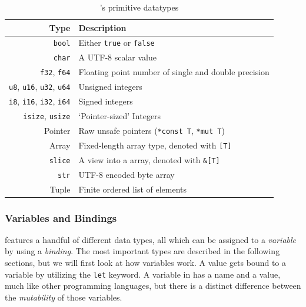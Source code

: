 \begin{table}[H]
  \centering
  \begin{tabular}{r|l}
    \textbf{Type} & \textbf{Description} \\
    \hline
    \texttt{bool}  & Either \texttt{true} or \texttt{false} \\
    \texttt{char}  & A UTF-8 scalar value \\
    \texttt{f32}, \texttt{f64} & Floating point number of single and double precision \\
    \texttt{u8}, \texttt{u16}, \texttt{u32}, \texttt{u64} & Unsigned integers \\
    \texttt{i8}, \texttt{i16}, \texttt{i32}, \texttt{i64} & Signed integers \\
    \texttt{isize}, \texttt{usize}                        & `Pointer-sized' Integers \\
    Pointer        & Raw unsafe pointers (\texttt{*const T}, \texttt{*mut T}) \\
    Array          & Fixed-length array type, denoted with \texttt{[T]} \\
    \texttt{slice} & A view into a array, denoted with \texttt{\&[T]} \\
    \texttt{str}   & UTF-8 encoded byte array \\
    Tuple          & Finite ordered list of elements \\
    \hline
  \end{tabular}

  \caption{\rust's primitive datatypes}
  \label{tab:rust:datatypes}
\end{table}




\subsubsection{Variables and Bindings}

\rust features a handful of different data types, all which can be assigned to a \emph{variable} by using a \emph{binding}.
The most important types are described in the following sections, but we will first look at how variables work.
A value gets bound to a variable by utilizing the \texttt{let} keyword.
A variable in \rust has a name and a value, much like other programming languages, but there is a distinct difference between the \emph{mutability} of those variables.

